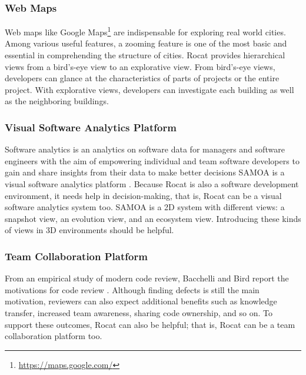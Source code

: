 \documentclass[conference]{IEEEtran}
\begin{document}
\subsubsection{Web Maps}
Web maps like \textsf{Google Maps}\footnote{\url{https://maps.google.com/}} are indispensable for exploring real world cities.
Among various useful features, a zooming feature is one of the most basic and essential in comprehending the structure of cities. 
\textsf{Rocat} provides hierarchical views from a bird's-eye view to an explorative view.
From bird's-eye views, developers can glance at the characteristics of parts of projects or the entire project.
With explorative views, developers can investigate each building as well as the neighboring buildings.

\subsubsection{Visual Software Analytics Platform}
Software analytics is an analytics on software data for managers and software engineers with the aim of empowering individual and team software developers to gain and share insights from their data to make better decisions \cite{Menzies:2013:SAS:2553351.2553360} \textsf{SAMOA} is a visual software analytics platform \cite{6676936}.
Because \textsf{Rocat} is also a software development environment, it needs help in decision-making, that is, \textsf{Rocat} can be a visual software analytics system too.
\textsf{SAMOA} is a 2D system with different views: a snapshot view, an evolution view, and an ecosystem view.
Introducing these kinds of views in 3D environments should be helpful.

\subsubsection{Team Collaboration Platform}
From an empirical study of modern code review, Bacchelli and Bird report the motivations for code review \cite{Bacchelli:2013:EOC:2486788.2486882}. 
Although finding defects is still the main motivation, reviewers can also expect additional benefits such as knowledge transfer, increased team awareness, sharing code ownership, and so on. 
To support these outcomes, \textsf{Rocat} can also be helpful; that is, \textsf{Rocat} can be a team collaboration platform too.
\end{document}
